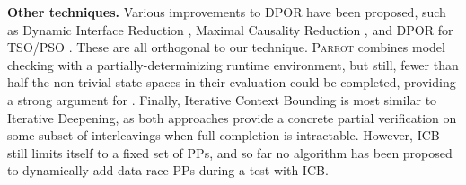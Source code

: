 {\bf Other techniques.} Various improvements to DPOR have been proposed, such as Dynamic Interface Reduction \cite{demeter}, Maximal Causality Reduction \cite{mcr}, and DPOR for TSO/PSO \cite{tsopso}.
These are all orthogonal to our technique.
\textsc{Parrot} \cite{parrot} combines model checking with a partially-determinizing runtime environment, but still, fewer than half the non-trivial state spaces in their evaluation could be completed, providing a strong argument for \quicksand.
Finally, Iterative Context Bounding \cite{chess} is most similar to Iterative Deepening, as both approaches provide a concrete partial verification on some subset of interleavings when full completion is intractable.
However, ICB still limits itself to a fixed set of PPs, and so far no algorithm has been proposed to dynamically add data race PPs during a test with ICB.






